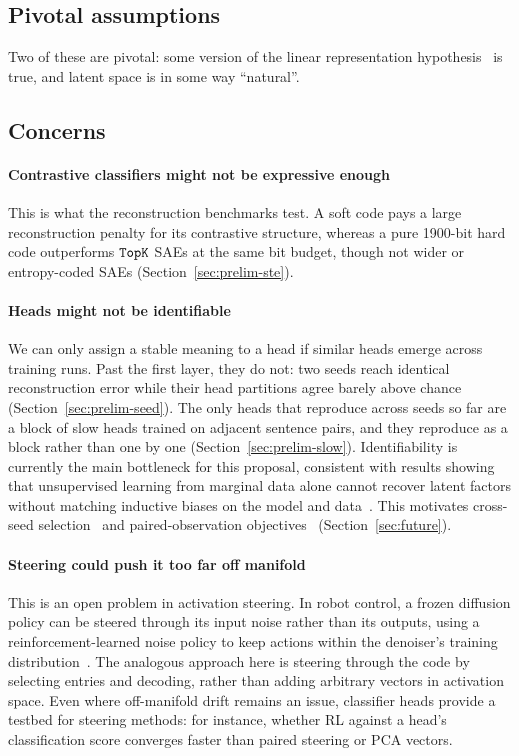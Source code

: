 \subsection{Pivotal assumptions}
Two of these are pivotal: some version of the linear representation
hypothesis~\cite{park2023linear,park2025} is true, and latent space is in
some way ``natural''.

\subsection{Concerns}

\paragraph{Contrastive classifiers might not be expressive enough}
This is what the reconstruction benchmarks test. A soft code pays a
large reconstruction penalty for its contrastive structure, whereas a
pure 1900-bit hard code outperforms $\mathop{\mathtt{TopK}}\limits$ SAEs at the same bit budget,
though not wider or entropy-coded SAEs (Section~\ref{sec:prelim-ste}).

\paragraph{Heads might not be identifiable}
We can only assign a stable meaning to a head if similar heads emerge
across training runs. Past the first layer, they do not: two seeds reach
identical reconstruction error while their head partitions agree barely
above chance (Section~\ref{sec:prelim-seed}). The only heads that
reproduce across seeds so far are a block of slow heads trained on
adjacent sentence pairs, and they reproduce as a block rather than one by
one (Section~\ref{sec:prelim-slow}). Identifiability is
currently the main bottleneck for this proposal, consistent with
results showing that unsupervised learning from marginal data alone
cannot recover latent factors without matching inductive biases on the
model and data~\cite{locatello2019,hillar2015}. This motivates
cross-seed selection~\cite{udr2020,allman2009} and paired-observation
objectives~\cite{pcl2017,slowvae2021,locatello2020,ivae2020,zimmermann2021}
(Section~\ref{sec:future}).

\paragraph{Steering could push it too far off manifold}
This is an open problem in activation steering. In robot control, a
frozen diffusion policy can be steered through its input noise rather
than its outputs, using a reinforcement-learned noise policy to keep
actions within the denoiser's training distribution~\cite{wagenmaker2025}.
The analogous approach here is steering through the code by selecting
entries and decoding, rather than adding arbitrary vectors in activation
space. Even where off-manifold drift remains an issue, classifier heads
provide a testbed for steering methods: for instance, whether RL against
a head's classification score converges faster than paired steering or
PCA vectors.

